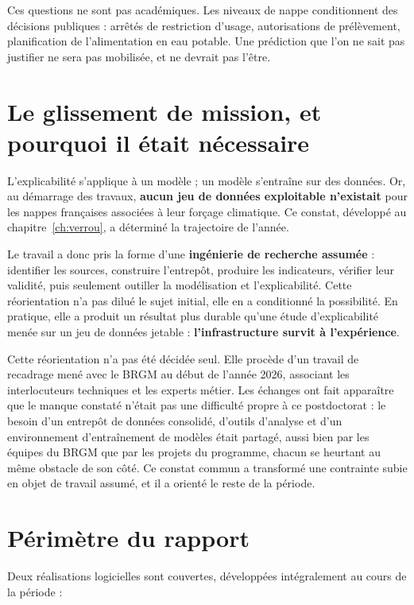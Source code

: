Ces questions ne sont pas académiques. Les niveaux de nappe conditionnent des décisions
publiques : arrêtés de restriction d'usage, autorisations de prélèvement, planification de
l'alimentation en eau potable. Une prédiction que l'on ne sait pas justifier ne sera pas
mobilisée, et ne devrait pas l'être.

\section{Le glissement de mission, et pourquoi il était nécessaire}

L'explicabilité s'applique à un modèle ; un modèle s'entraîne sur des données. Or, au démarrage
des travaux, \textbf{aucun jeu de données exploitable n'existait} pour les nappes françaises
associées à leur forçage climatique. Ce constat, développé au chapitre~\ref{ch:verrou}, a
déterminé la trajectoire de l'année.

Le travail a donc pris la forme d'une \textbf{ingénierie de recherche assumée} : identifier les
sources, construire l'entrepôt, produire les indicateurs, vérifier leur validité, puis seulement
outiller la modélisation et l'explicabilité. Cette réorientation n'a pas dilué le sujet initial,
elle en a conditionné la possibilité. En pratique, elle a produit un résultat plus durable
qu'une étude d'explicabilité menée sur un jeu de données jetable : \textbf{l'infrastructure
survit à l'expérience}.

Cette réorientation n'a pas été décidée seul. Elle procède d'un travail de recadrage mené avec
le BRGM au début de l'année 2026, associant les interlocuteurs techniques et les experts métier.
Les échanges ont fait apparaître que le manque constaté n'était pas une difficulté propre à ce
postdoctorat : le besoin d'un entrepôt de données consolidé, d'outils d'analyse et d'un
environnement d'entraînement de modèles était partagé, aussi bien par les équipes du BRGM que
par les projets du programme, chacun se heurtant au même obstacle de son côté. Ce constat
commun a transformé une contrainte subie en objet de travail assumé, et il a orienté le reste
de la période.

\section{Périmètre du rapport}

Deux réalisations logicielles sont couvertes, développées intégralement au cours de la période :

